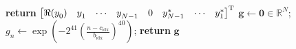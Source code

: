 \begin{algorithm}
\begin{algorithmic}
            \State \textbf{return} $
            \begin{bmatrix}
                \Re(y_0^{\vphantom{*}}) & y_1^{\vphantom{*}} & \cdots & y_{N-1}^{\vphantom{*}} & 0 & y_{N-1}^* & \cdots & y_1^*
            \end{bmatrix}^{\mathrm{T}}
            $
        \EndProcedure
        \Statex
            \State $\symbf{g} \gets \symbf{0} \in \mathbb{R}^{N}$;
                \State $g_n \gets \exp\left(
                    -2^{41} \left(
                        \frac{n - c_{\text{idx}}}{b_{\text{idx}}}
                    \right)^{40}
                    \right)
                $;
            \EndFor
            \State \textbf{return} $\symbf{g}$
        \EndProcedure
    \end{algorithmic}
\end{algorithm}
